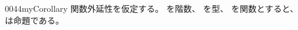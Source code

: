 \documentclass[index]{subfiles}
\begin{document}
\begin{myBlock}{0044}{myCorollary}
  関数外延性を仮定する。
  を階数、
  を型、
  を関数とすると、
  は命題である。\myQed
\end{myBlock}
\end{document}
